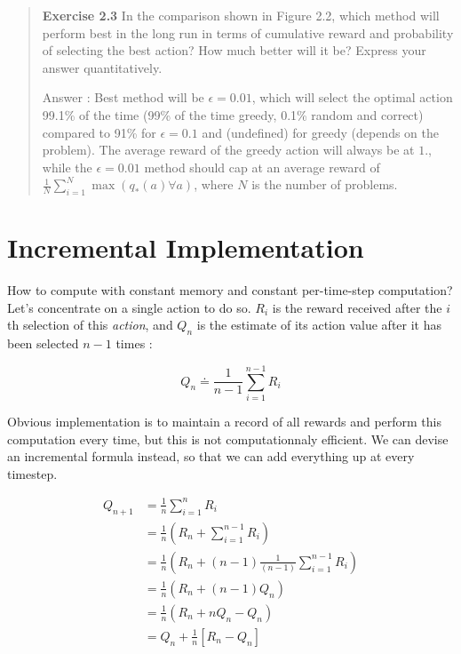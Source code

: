 \documentclass{article}
\begin{document}
\begin{quote}
\textbf{Exercise 2.3} In the comparison shown in Figure 2.2, which method will perform best in the long run in terms of cumulative reward and probability of selecting the best action? How much better will it be? Express your answer quantitatively.

Answer : Best method will be $\epsilon=0.01$, which will select the optimal action 99.1\% of the time (99\% of the time greedy, 0.1\% random and correct) compared to 91\% for $\epsilon=0.1$ and (undefined) for greedy (depends on the problem). The average reward of the greedy action will always be at $1.$, while the $\epsilon=0.01$ method should cap at an average reward of $\frac{1}{N}\sum_{i=1}^{N} \max(q_*(a) \forall a)$, where $N$ is the number of problems.
\end{quote}


\section{Incremental Implementation}

How to compute with constant memory and constant per-time-step computation? Let's concentrate on a single action to do so. $R_i$ is the reward received after the $i$th selection of this \textit{action}, and $Q_n$ is the estimate of its action value after it has been selected $n-1$ times :

\begin{equation}
Q_n \doteq \frac{1}{n-1}\sum_{i=1}^{n-1} R_i
\end{equation}

Obvious implementation is to maintain a record of all rewards and perform this computation every time, but this is not computationnaly efficient. We can devise an incremental formula instead, so that we can add everything up at every timestep.

\begin{equation}
\begin{split}
Q_{n+1} & = \frac{1}{n}\sum_{i=1}^{n} R_i \\
 & = \frac{1}{n} \left( R_n + \sum_{i=1}^{n-1} R_i \right) \\
 & = \frac{1}{n} \left( R_n + (n-1)\frac{1}{(n-1)} \sum_{i=1}^{n-1} R_i \right) \\
 & = \frac{1}{n} \left( R_n + (n-1)Q_n \right) \\
 & = \frac{1}{n} \left( R_n + nQ_n - Q_n \right) \\
 & = Q_n + \frac{1}{n}\left[ R_n - Q_n \right]
\end{split}
\end{equation}
\end{document}
